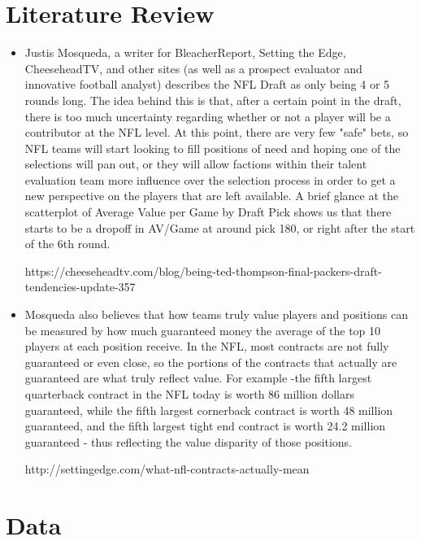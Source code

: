 \documentclass{article}
\begin{document}
\section{Literature Review}
\begin{itemize}
    \item Justis Mosqueda, a writer for BleacherReport, Setting the Edge, CheeseheadTV, and other sites (as well as a prospect evaluator and innovative football analyst) describes the NFL Draft as only being 4 or 5 rounds long. The idea behind this is that, after a certain point in the draft, there is too much uncertainty regarding whether or not a player will be a contributor at the NFL level. At this point, there are very few "safe" bets, so NFL teams will start looking to fill positions of need and hoping one of the selections will pan out, or they will allow factions within their talent evaluation team more influence over the selection process in order to get a new perspective on the players that are left available. A brief glance at the scatterplot of Average Value per Game by Draft Pick shows us that there starts to be a dropoff in AV/Game at around pick 180, or right after the start of the 6th round.
    
    https://cheeseheadtv.com/blog/being-ted-thompson-final-packers-draft-tendencies-update-357
    
    \item Mosqueda also believes that how teams truly value players and positions can be measured by how much guaranteed money the average of the top 10 players at each position receive. In the NFL, most contracts are not fully guaranteed or even close, so the portions of the contracts that actually are guaranteed are what truly reflect value. For example -the fifth largest quarterback contract in the NFL today is worth 86 million dollars guaranteed, while the fifth largest cornerback contract is worth 48 million guaranteed, and the fifth largest tight end contract is worth 24.2 million guaranteed - thus reflecting the value disparity of those positions.
    
    
    http://settingedge.com/what-nfl-contracts-actually-mean
    
\end{itemize}

\section{Data}
\end{document}

